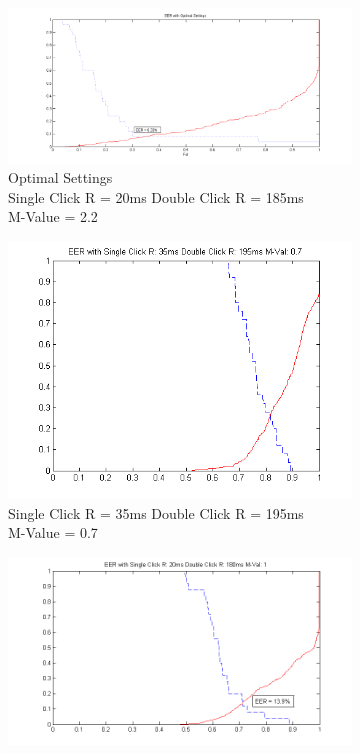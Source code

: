 \documentclass[conference]{IEEEtran}
\begin{document}
\begin{figure}[t!]
\begin{subfigure}{.5\textwidth}
  \centering
  \includegraphics[width=.8\linewidth]{Optimal}
  \caption{Optimal Settings\\Single Click R = 20ms Double Click R = 185ms\\M-Value = 2.2}
  \label{fig:sfig1}
\end{subfigure}%
\begin{subfigure}{.5\textwidth}
  \centering
  \includegraphics[width=.8\linewidth]{7M}
  \caption{Single Click R = 35ms Double Click R = 195ms\\M-Value = 0.7}
  \label{fig:sfig2}
\end{subfigure}
\begin{subfigure}{.5\textwidth}
  \centering
  \includegraphics[width=.8\linewidth]{M1}

\end{subfigure}
\end{figure}
\end{document}
